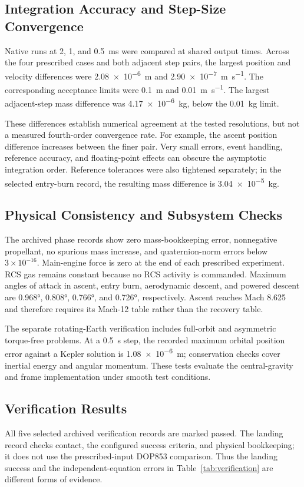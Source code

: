 \documentclass[11pt,letterpaper]{article}
\begin{document}
\subsection{Integration Accuracy and Step-Size Convergence}
Native runs at 2, 1, and \SI{0.5}{\milli\second} were compared at shared output times. Across the four prescribed cases and both adjacent step pairs, the largest position and velocity differences were \SI{2.08e-6}{\metre} and \SI{2.90e-7}{\metre\per\second}. The corresponding acceptance limits were \SI{0.1}{\metre} and \SI{0.01}{\metre\per\second}. The largest adjacent-step mass difference was \SI{4.17e-6}{\kilogram}, below the \SI{0.01}{\kilogram} limit.

These differences establish numerical agreement at the tested resolutions, but not a measured fourth-order convergence rate. For example, the ascent position difference increases between the finer pair. Very small errors, event handling, reference accuracy, and floating-point effects can obscure the asymptotic integration order. Reference tolerances were also tightened separately; in the selected entry-burn record, the resulting mass difference is \SI{3.04e-5}{\kilogram}.

\subsection{Physical Consistency and Subsystem Checks}
The archived phase records show zero mass-bookkeeping error, nonnegative propellant, no spurious mass increase, and quaternion-norm errors below $3\times10^{-16}$. Main-engine force is zero at the end of each prescribed experiment. RCS gas remains constant because no RCS activity is commanded. Maximum angles of attack in ascent, entry burn, aerodynamic descent, and powered descent are \ang{0.968}, \ang{0.808}, \ang{0.766}, and \ang{0.726}, respectively. Ascent reaches Mach 8.625 and therefore requires its Mach-12 table rather than the recovery table.

The separate rotating-Earth verification includes full-orbit and asymmetric torque-free problems. At a \SI{0.5}{\second} step, the recorded maximum orbital position error against a Kepler solution is \SI{1.08e-6}{\metre}; conservation checks cover inertial energy and angular momentum. These tests evaluate the central-gravity and frame implementation under smooth test conditions.

\subsection{Verification Results}
All five selected archived verification records are marked passed. The landing record checks contact, the configured success criteria, and physical bookkeeping; it does not use the prescribed-input DOP853 comparison. Thus the landing success and the independent-equation errors in Table~\ref{tab:verification} are different forms of evidence.
\end{document}
